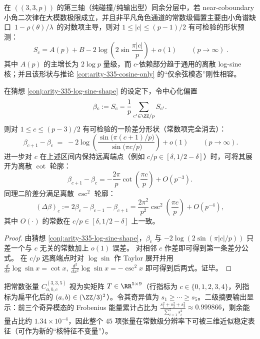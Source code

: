 \begin{conjecture}\label{conj:arity-335-log-sine-shape}
在 \(((3,3,p))\) 的第三轴（纯碰撞/纯输出型）同余分层中，若 near-coboundary 小角二次律在大模数极限成立，并且非平凡角色通道的常数级偏置主要由小角谱缺口 \(\,1-\rho(\theta)/\lambda\,\) 的对数项主导，则对 \(1\le |c|\le (p-1)/2\) 有可检验的形状预测：
\[
\boxed{\;
S_c=A(p)+B-2\log\!\left(2\sin\frac{\pi |c|}{p}\right)+o(1)\qquad(p\to\infty)\; }.
\]
其中 \(A(p)\) 的主增长为 \(2\log p\) 量级，而 \(c\)-依赖部分趋于通用的离散 log-sine 核；并且该形状与推论 \ref{cor:arity-335-cosine-only} 的“仅余弦模态”刚性相容。
\end{conjecture}

\begin{corollary}\label{cor:arity-335-log-sine-differences}
在猜想 \ref{conj:arity-335-log-sine-shape} 的设定下，令中心化偏置
\[
\beta_c:=S_c-\frac{1}{p}\sum_{c'\in\ZZ/p}S_{c'}.
\]
则对 \(1\le c\le (p-3)/2\) 有可检验的一阶差分形状（常数项完全消去）：
\[
\boxed{\
\beta_{c+1}-\beta_{c}
\;=\;
-2\log\!\left(\frac{\sin\!\bigl(\pi(c+1)/p\bigr)}{\sin\!\bigl(\pi c/p\bigr)}\right)
 +o(1)\qquad(p\to\infty).
}
\]
进一步对 \(c\) 在上述区间内保持远离端点（例如 \(c/p\in[\delta,1/2-\delta]\)）时，可将其展开为离散 \(\cot\) 轮廓：
\[
\beta_{c+1}-\beta_c
=-\frac{2\pi}{p}\cot\!\left(\frac{\pi c}{p}\right)+O(p^{-3}).
\]
同理二阶差分满足离散 \(\csc^2\) 轮廓：
\[
(\Delta\beta)_c:=2\beta_c-\beta_{c-1}-\beta_{c+1}
=\frac{2\pi^2}{p^2}\csc^2\!\left(\frac{\pi c}{p}\right)+O(p^{-4}),
\]
其中 \(O(\cdot)\) 的常数在 \(c/p\in[\delta,1/2-\delta]\) 上一致。
\end{corollary}
\begin{proof}
由猜想 \ref{conj:arity-335-log-sine-shape}，\(\beta_c\) 与 \(-2\log(2\sin(\pi|c|/p))\) 只差一个与 \(c\) 无关的常数加上 \(o(1)\) 误差。
对相邻 \(c\) 作差即可得到第一条差分公式。
在 \(c/p\) 远离端点时对 \(\log\sin\) 作 Taylor 展开并用
\(
\frac{d}{dx}\log\sin x=\cot x,\ 
\frac{d^2}{dx^2}\log\sin x=-\csc^2 x
\)
即可得到后两式。证毕。
\end{proof}

\begin{proposition}\label{prop:arity-335-low-rank}
把常数张量 $C^{(3,3,5)}_{a,b,c}$ 视为实矩阵 $T\in\RR^{5\times 9}$（行指标为 $c\in\{0,1,2,3,4\}$，列指标为扁平化后的 $(a,b)\in(\ZZ/3)^2$）。令其奇异值为 $s_1\ge \cdots\ge s_5$。二级摘要输出显示：前三个奇异模态的 Frobenius 能量累计占比为 $\frac{s_1^2+s_2^2+s_3^2}{\sum_{i=1}^5 s_i^2}\approx 0.999866$，剩余能量占比约 $1.34\times 10^{-4}$，因此整个 $45$ 项张量在常数级分辨率下可被三维近似稳定表征（可作为新的``核特征不变量''）。
\end{proposition}

